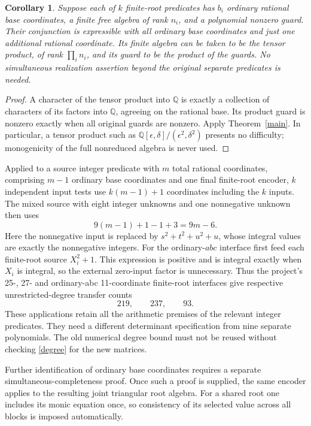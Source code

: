 \documentclass[11pt]{article}
\newtheorem{corollary}[theorem]{Corollary}
\newcommand{\Q}{\mathbb Q}\newcommand{\Z}{\mathbb Z}
\begin{document}
\begin{corollary}\label{merge}
Suppose each of $k$ finite-root predicates has $b_i$ ordinary rational
base coordinates, a finite free algebra of rank $n_i$, and a polynomial
nonzero guard. Their conjunction is expressible with all ordinary base
coordinates and just one additional rational coordinate. Its finite
algebra can be taken to be the tensor product, of rank $\prod_i n_i$,
and its guard to be the product of the guards. No simultaneous
realization assertion beyond the original separate predicates is needed.
\end{corollary}
\begin{proof}
A character of the tensor product into $\Q$ is exactly a collection of
characters of its factors into $\Q$, agreeing on the rational base.
Its product guard is nonzero exactly when all original guards are nonzero.
Apply Theorem~\ref{main}. In particular, a tensor product such as
$\Q[\epsilon,\delta]/(\epsilon^2,\delta^2)$ presents no difficulty;
monogenicity of the full nonreduced algebra is never used.
\end{proof}

Applied to a source integer predicate with $m$ total rational coordinates,
comprising $m-1$ ordinary base coordinates and one final finite-root encoder, $k$ independent input
tests use $k(m-1)+1$ coordinates including the $k$ inputs. The mixed source
with eight integer unknowns and one nonnegative unknown then uses
\[
                    9(m-1)+1-1+3=9m-6.
\]
Here the nonnegative input is replaced by $s^2+t^2+u^2+u$, whose integral
values are exactly the nonnegative integers. For the ordinary-$abc$
interface first feed each finite-root source $X_i^2+1$. This expression is
positive and is integral exactly when $X_i$ is integral, so the external
zero-input factor is unnecessary. Thus the project's
25-, 27- and ordinary-abc 11-coordinate finite-root interfaces give
respective unrestricted-degree transfer counts
\[
                              219,\qquad237,\qquad93.
\]
These applications retain all the arithmetic premises of the relevant
integer predicates. They need a different determinant specification from
nine separate polynomials. The old numerical degree bound must not be
reused without checking \eqref{degree} for the new matrices.

Further identification of ordinary base coordinates requires a separate
simultaneous-completeness proof. Once such a proof is supplied, the same
encoder applies to the resulting joint triangular root algebra. For a
shared root one includes its monic equation once, so consistency of its
selected value across all blocks is imposed automatically.
\end{document}
